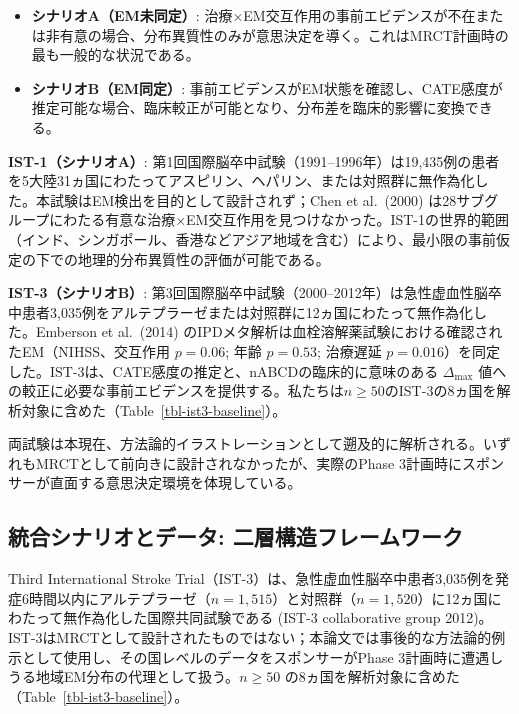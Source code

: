 \documentclass[
  a4paper,
  11pt]{ltjsarticle}
\providecommand{\tightlist}{%
  \setlength{\itemsep}{0pt}\setlength{\parskip}{0pt}}\usepackage{longtable,booktabs,array}
\begin{document}
\begin{itemize}
\tightlist
\item
  \textbf{シナリオA（EM未同定）}:
  治療×EM交互作用の事前エビデンスが不在または非有意の場合、分布異質性のみが意思決定を導く。これはMRCT計画時の最も一般的な状況である。
\item
  \textbf{シナリオB（EM同定）}:
  事前エビデンスがEM状態を確認し、CATE感度が推定可能な場合、臨床較正が可能となり、分布差を臨床的影響に変換できる。
\end{itemize}

\textbf{IST-1（シナリオA）}:
第1回国際脳卒中試験（1991--1996年）は19,435例の患者を5大陸31ヵ国にわたってアスピリン、ヘパリン、または対照群に無作為化した。本試験はEM検出を目的として設計されず；Chen
et al.~(2000)
は28サブグループにわたる有意な治療×EM交互作用を見つけなかった。IST-1の世界的範囲（インド、シンガポール、香港などアジア地域を含む）により、最小限の事前仮定の下での地理的分布異質性の評価が可能である。

\textbf{IST-3（シナリオB）}:
第3回国際脳卒中試験（2000--2012年）は急性虚血性脳卒中患者3,035例をアルテプラーゼまたは対照群に12ヵ国にわたって無作為化した。Emberson
et al.~(2014)
のIPDメタ解析は血栓溶解薬試験における確認されたEM（NIHSS、交互作用
\(p=0.06\); 年齢 \(p=0.53\); 治療遅延
\(p=0.016\)）を同定した。IST-3は、CATE感度の推定と、nABCDの臨床的に意味のある
\(\Delta_{\max}\)
値への較正に必要な事前エビデンスを提供する。私たちは\(n \geq 50\)のIST-3の8ヵ国を解析対象に含めた（Table~\ref{tbl-ist3-baseline}）。

両試験は本現在、方法論的イラストレーションとして遡及的に解析される。いずれもMRCTとして前向きに設計されなかったが、実際のPhase
3計画時にスポンサーが直面する意思決定環境を体現している。

\subsection{統合シナリオとデータ:
二層構造フレームワーク}\label{ux7d71ux5408ux30b7ux30caux30eaux30aaux3068ux30c7ux30fcux30bf-ux4e8cux5c64ux69cbux9020ux30d5ux30ecux30fcux30e0ux30efux30fcux30af}

Third International Stroke
Trial（IST-3）は、急性虚血性脳卒中患者3,035例を発症6時間以内にアルテプラーゼ（\(n=1{,}515\)）と対照群（\(n=1{,}520\)）に12ヵ国にわたって無作為化した国際共同試験である
(IST-3 collaborative group
2012)。IST-3はMRCTとして設計されたものではない；本論文では事後的な方法論的例示として使用し、その国レベルのデータをスポンサーがPhase
3計画時に遭遇しうる地域EM分布の代理として扱う。\(n \geq 50\)
の8ヵ国を解析対象に含めた（Table~\ref{tbl-ist3-baseline}）。
\end{document}
